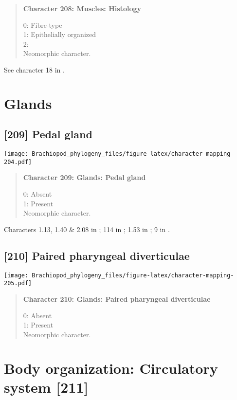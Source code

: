 \documentclass[openany]{book}
\theoremstyle{definition}
\theoremstyle{definition}
\theoremstyle{definition}
\theoremstyle{remark}
\begin{document}
\begin{quote}
\textbf{Character 208: Muscles: Histology}

0: Fibre-type\\
1: Epithelially organized\\
2:\\
Neomorphic character.
\end{quote}

See character 18 in \citet{Haszprunar1996}.

\section{Glands}\label{glands-1}

\subsection*{{[}209{]} Pedal gland}\label{pedal-gland-1}

\texttt{[image: Brachiopod\_phylogeny\_files/figure-latex/character-mapping-204.pdf]}

\begin{quote}
\textbf{Character 209: Glands: Pedal gland}

0: Absent\\
1: Present\\
Neomorphic character.
\end{quote}

Characters 1.13, 1.40 \& 2.08 in \citet{Scheltema1993}; 114 in
\citet{Giribet2002}; 1.53 in \citet{SPS1996}; 9 in
\citet{Haszprunar1996}.

\subsection*{{[}210{]} Paired pharyngeal
diverticulae}\label{paired-pharyngeal-diverticulae}

\texttt{[image: Brachiopod\_phylogeny\_files/figure-latex/character-mapping-205.pdf]}

\begin{quote}
\textbf{Character 210: Glands: Paired pharyngeal diverticulae}

0: Absent\\
1: Present\\
Neomorphic character.
\end{quote}

\section{Body organization: Circulatory system
{[}211{]}}\label{body-organization-circulatory-system-211}
\end{document}
